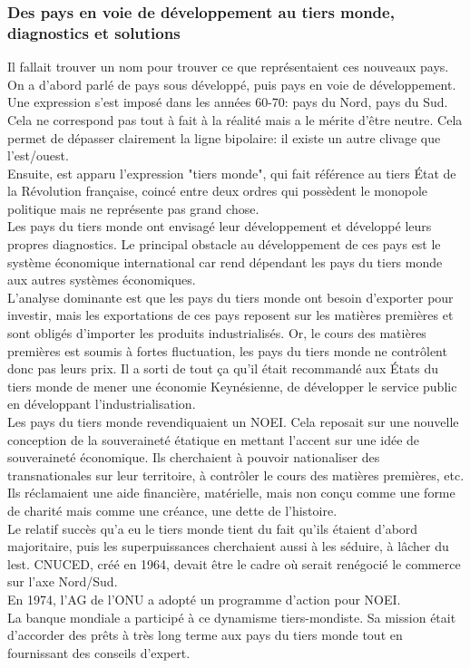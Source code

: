 \documentclass[10pt, a4paper, openany]{book}
\begin{document}
\subsubsection{Des pays en voie de développement au tiers monde, diagnostics et solutions}

Il fallait trouver un nom pour trouver ce que représentaient ces nouveaux pays. On a d'abord parlé de pays sous développé, puis pays en voie de développement. \\
Une expression s'est imposé dans les années 60-70: pays du Nord, pays du Sud. Cela ne correspond pas tout à fait à la réalité mais a le mérite d'être neutre. Cela permet de dépasser clairement la ligne bipolaire: il existe un autre clivage que l'est/ouest. \\
Ensuite, est apparu l'expression "tiers monde", qui fait référence au tiers État de la Révolution française, coincé entre deux ordres qui possèdent le monopole politique mais ne représente pas grand chose. \\
Les pays du tiers monde ont envisagé leur développement et développé leurs propres diagnostics. Le principal obstacle au développement de ces pays est le système économique international car rend dépendant les pays du tiers monde aux autres systèmes économiques. \\
L'analyse dominante est que les pays du tiers monde ont besoin d'exporter pour investir, mais les exportations de ces pays reposent sur les matières premières et sont obligés d'importer les produits industrialisés. Or, le cours des matières premières est soumis à fortes fluctuation, les pays du tiers monde ne contrôlent donc pas leurs prix. Il a sorti de tout ça qu'il était recommandé aux États du tiers monde de mener une économie Keynésienne, de développer le service public en développant l'industrialisation. \\
Les pays du tiers monde revendiquaient un NOEI. Cela reposait sur une nouvelle conception de la souveraineté étatique en mettant l'accent sur une idée de souveraineté économique. Ils cherchaient à pouvoir nationaliser des transnationales sur leur territoire, à contrôler le cours des matières premières, etc. Ils réclamaient une aide financière, matérielle, mais non conçu comme une forme de charité mais comme une créance, une dette de l'histoire. \\
Le relatif succès qu'a eu le tiers monde tient du fait qu'ils étaient d'abord majoritaire, puis les superpuissances cherchaient aussi à les séduire, à lâcher du lest. CNUCED, créé en 1964, devait être le cadre où serait renégocié le commerce sur l'axe Nord/Sud. \\
En 1974, l'AG de l'ONU a adopté un programme d'action pour NOEI. \\
La banque mondiale a participé à ce dynamisme tiers-mondiste. Sa mission était d'accorder des prêts à très long terme aux pays du tiers monde tout en fournissant des conseils d'expert. 
\end{document}
